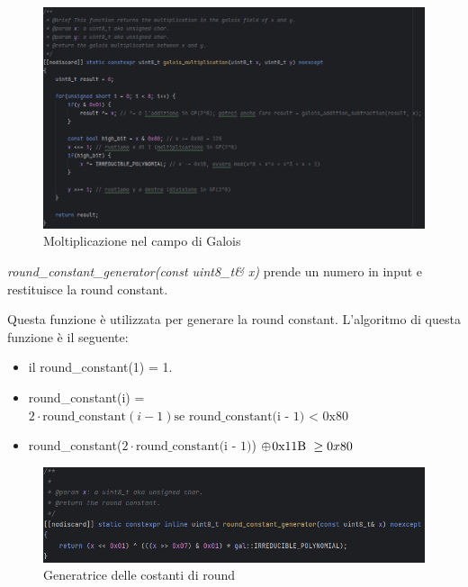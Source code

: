 \begin{figure}[H]
	\centering
	\includegraphics[width=1\textwidth, height=1\textheight, keepaspectratio]{./images/code/cpp/galois_math/galois_multiplication.PNG}
	\caption{Moltiplicazione nel campo di Galois}
	\label{fig:galois_multiplication}
\end{figure}


\textsf{\small \emph{round\_constant\_generator(const uint8\_t\& x)} prende un numero in input e restituisce la round constant.}


\textsf{\small Questa funzione è utilizzata per generare la round constant.}
\textsf{\small L'algoritmo di questa funzione è il seguente: }

\begin{itemize}
	\item \textsf{\small il round\_constant(1) = 1.}
	\item \textsf{\small round\_constant(i) = $2 \cdot \text{round\_constant}(i - 1) \text{se round\_constant(i - 1) < 0x80}$}
	\item \textsf{\small round\_constant($2 \cdot \text{round\_constant(i - 1)}$) $ \oplus \hspace{0.3mm} \text{0x11B } \ge 0x80$ }
\end{itemize}

\begin{figure}[H]
	\centering
	\includegraphics[width=1\textwidth, height=1\textheight, keepaspectratio]{./images/code/cpp/galois_math/round_constant_generator.PNG}
	\caption{Generatrice delle costanti di round}
	\label{fig:round_constant_generator}
\end{figure}

